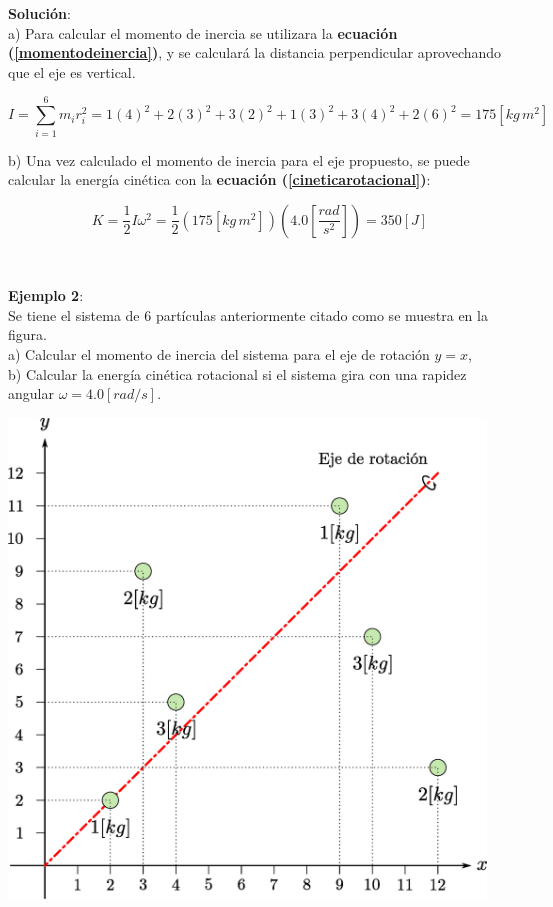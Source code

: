 \documentclass[letter,oneside,11pt]{article}
\begin{document}
\begin{minipage}[b]{.9\linewidth}
\textbf{Solución}:\\
a) Para calcular el momento de inercia se utilizara la \textbf{ecuación
(\ref{momentodeinercia})}, y se calculará la distancia perpendicular
aprovechando que el eje es vertical.

\begin{equation*}
    I = \sum_{i=1}^{6} m_i r^2_i = 1 (4)^2 + 2(3)^2 + 3(2)^2 + 1(3)^2 + 3(4)^2 + 2(6)^2 = 175 [kg\, m^2]
\end{equation*}

b) Una vez calculado el momento de inercia para el eje propuesto, se puede
calcular la energía cinética con la \textbf{ecuación
(\ref{cineticarotacional})}:

\begin{equation*}
    K = \frac{1}{2} I \omega^2 =  \frac{1}{2} \left(175 [kg\, m^2]\right) \left(4.0 \left[\frac{rad}{s^2}\right]\right) = 350 [J]
\end{equation*}
\end{minipage}
\\

\begin{minipage}[b]{.4\linewidth}
\textbf{Ejemplo 2}:\\
Se tiene el sistema de 6 partículas anteriormente citado como se muestra en la
figura. \\

a) Calcular el momento de inercia del sistema para el eje de rotación $y = x$, \\
b) Calcular la energía cinética rotacional si el sistema gira con una rapidez
angular $\omega = 4.0 [rad/s]$.
\end{minipage}\hfill
\begin{minipage}{.5\linewidth}
\includegraphics[width=0.95\textwidth]{resources/f3.eps}
\end{minipage}
\end{document}
